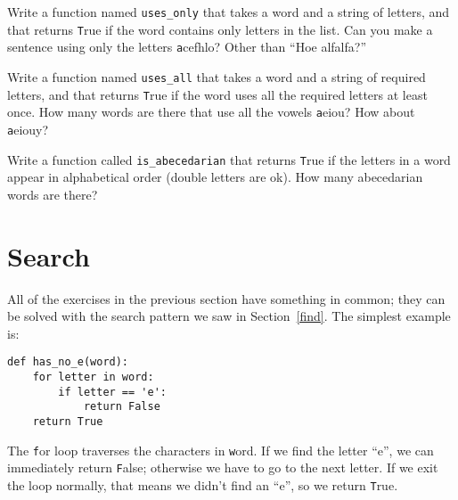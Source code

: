 \documentclass[
DIV=11,
fontsize=12,
twoside,
headinclude=false,
titlepage=firstiscover,
abstract=true,
headsepline=true,
footsepline=true,
chapterprefix=true, %
headings=big,
bibliography=totoc,%
captions=tableheading
]{scrbook}
\theoremstyle{definition}
\begin{document}
\begin{exercise}
\normalfont

Write a function named \verb"uses_only" that takes a word and a
string of letters, and that returns {\texttt True} if the word contains
only letters in the list.  Can you make a sentence using only the
letters {\texttt acefhlo}?  Other than ``Hoe alfalfa?''

\end{exercise}


\begin{exercise}
\normalfont 

Write a function named \verb"uses_all" that takes a word and a
string of required letters, and that returns {\texttt True} if the word
uses all the required letters at least once.  How many words are there
that use all the vowels {\texttt aeiou}?  How about {\texttt aeiouy}?

\end{exercise}


\begin{exercise}
\normalfont

Write a function called \verb"is_abecedarian" that returns
{\texttt True} if the letters in a word appear in alphabetical order
(double letters are ok).  
How many abecedarian words are there?


\end{exercise}



\section{Search}
\label{search}

All of the exercises in the previous section have something
in common; they can be solved with the search pattern we saw
in Section~\ref{find}.  The simplest example is:

\begin{lstlisting}
def has_no_e(word):
    for letter in word:
        if letter == 'e':
            return False
    return True
\end{lstlisting}
%
The {\texttt for} loop traverses the characters in {\texttt word}.  If we find
the letter ``e'', we can immediately return {\texttt False}; otherwise we
have to go to the next letter.  If we exit the loop normally, that
means we didn't find an ``e'', so we return {\texttt True}.
\end{document}
